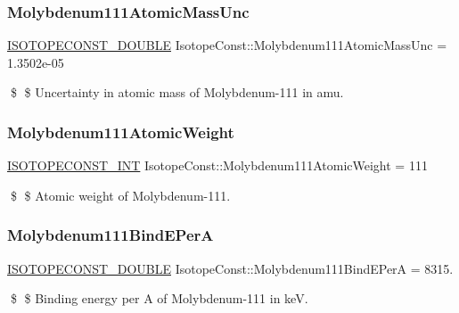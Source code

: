 \subsubsection{\texorpdfstring{Molybdenum111\+Atomic\+Mass\+Unc}{Molybdenum111AtomicMassUnc}}
{\footnotesize\ttfamily \mbox{\hyperlink{group___isotope_const-_macros_ga8f45a7272ce02c0b4c65c44636ed719a}{I\+S\+O\+T\+O\+P\+E\+C\+O\+N\+S\+T\+\_\+\+D\+O\+U\+B\+LE}} Isotope\+Const\+::\+Molybdenum111\+Atomic\+Mass\+Unc = 1.\+3502e-\/05}

\$ \$ Uncertainty in atomic mass of Molybdenum-\/111 in amu. \mbox{\label{group___isotope_const-_molybdenum-_mo111_gaace7c458f0a7886fef6432d38dc1534c}} 
\subsubsection{\texorpdfstring{Molybdenum111\+Atomic\+Weight}{Molybdenum111AtomicWeight}}
{\footnotesize\ttfamily \mbox{\hyperlink{group___isotope_const-_macros_ga5f18360b3e99483a35c32d789e62621c}{I\+S\+O\+T\+O\+P\+E\+C\+O\+N\+S\+T\+\_\+\+I\+NT}} Isotope\+Const\+::\+Molybdenum111\+Atomic\+Weight = 111}

\$ \$ Atomic weight of Molybdenum-\/111. \mbox{\label{group___isotope_const-_molybdenum-_mo111_gaf483060e674a7bbe7d1577c9f2b12e6d}} 
\subsubsection{\texorpdfstring{Molybdenum111\+Bind\+E\+PerA}{Molybdenum111BindEPerA}}
{\footnotesize\ttfamily \mbox{\hyperlink{group___isotope_const-_macros_ga8f45a7272ce02c0b4c65c44636ed719a}{I\+S\+O\+T\+O\+P\+E\+C\+O\+N\+S\+T\+\_\+\+D\+O\+U\+B\+LE}} Isotope\+Const\+::\+Molybdenum111\+Bind\+E\+PerA = 8315.}

\$ \$ Binding energy per A of Molybdenum-\/111 in keV. \mbox{\label{group___isotope_const-_molybdenum-_mo111_ga27789273455afa248b4ea4a23966a244}} 
